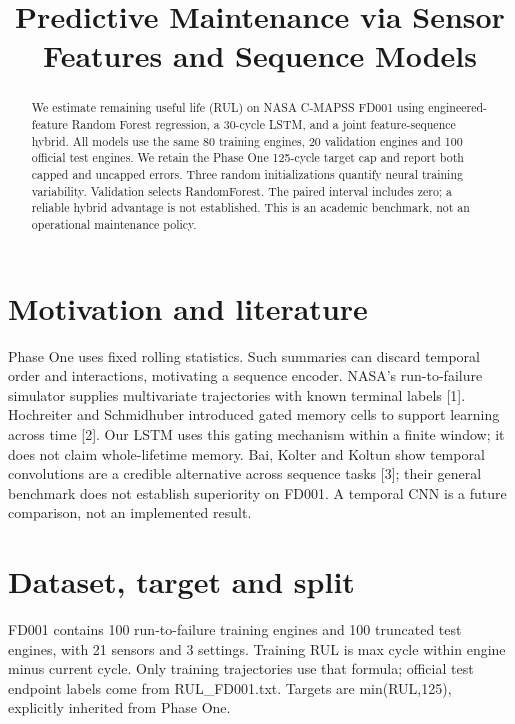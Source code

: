\documentclass[conference]{IEEEtran}
\begin{document}
\title{Predictive Maintenance via Sensor Features and Sequence Models}

\author{}

\maketitle

\begin{abstract}

We estimate remaining useful life (RUL) on NASA C-MAPSS FD001 using engineered-feature Random Forest regression, a 30-cycle LSTM, and a joint feature-sequence hybrid. All models use the same 80 training engines, 20 validation engines and 100 official test engines. We retain the Phase One 125-cycle target cap and report both capped and uncapped errors. Three random initializations quantify neural training variability. Validation selects RandomForest. The paired interval includes zero; a reliable hybrid advantage is not established. This is an academic benchmark, not an operational maintenance policy.

\end{abstract}

\section{Motivation and literature}

Phase One uses fixed rolling statistics. Such summaries can discard temporal order and interactions, motivating a sequence encoder. NASA's run-to-failure simulator supplies multivariate trajectories with known terminal labels [1]. Hochreiter and Schmidhuber introduced gated memory cells to support learning across time [2]. Our LSTM uses this gating mechanism within a finite window; it does not claim whole-lifetime memory. Bai, Kolter and Koltun show temporal convolutions are a credible alternative across sequence tasks [3]; their general benchmark does not establish superiority on FD001. A temporal CNN is a future comparison, not an implemented result.

\section{Dataset, target and split}

FD001 contains 100 run-to-failure training engines and 100 truncated test engines, with 21 sensors and 3 settings. Training RUL is max cycle within engine minus current cycle. Only training trajectories use that formula; official test endpoint labels come from RUL\_FD001.txt. Targets are min(RUL,125), explicitly inherited from Phase One.
\end{document}

